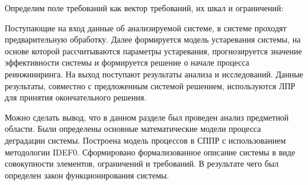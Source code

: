 Определим поле требований как вектор требований, их шкал и ограничений: 
















Поступающие на вход данные об анализируемой системе, в системе проходят предварительную обработку. 
Далее формируется модель устаревания системы, на основе которой рассчитываются параметры устаревания, прогнозируется значение эффективности системы и формируется решение о начале процесса реинжиниринга. 
На выход поступают результаты анализа и исследований. 
Данные результаты, совместно с предложенным системой решением, используются ЛПР для принятия окончательного решения.

Можно сделать вывод, что в данном разделе был проведен анализ предметной области. 
Были определены основные математические модели процесса деградации системы. 
Построена модель процессов в СППР с использованием методологии IDEF0. 
Сформировано формализованное описание системы в виде совокупности элементов, ограничений и требований. 
В результате чего был определен закон функционирования системы.



